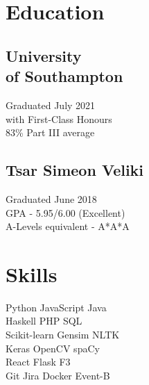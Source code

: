 \documentclass[]{resume}
\begin{document}
\hfill
%
%
\begin{minipage}[t]{0.30\textwidth} 


\section{Education} 

\subsection*{University \\ of Southampton}
Graduated July 2021\\
with First-Class Honours\\
83\% Part III average
\sectionsep
\sectionsep
\subsection*{Tsar Simeon Veliki}
Graduated June 2018\\
GPA - 5.95/6.00 (Excellent)\\
A-Levels equivalent - A*A*A
\sectionsep


\section{Skills}
Python \textbullet{} JavaScript \textbullet{} Java\\Haskell \textbullet{} PHP \textbullet{} SQL\\
Scikit-learn \textbullet{} Gensim \textbullet{} NLTK\\Keras \textbullet{} OpenCV \textbullet{} spaCy\\
React \textbullet{} Flask \textbullet{} F3\\
Git \textbullet{} Jira \textbullet{} Docker \textbullet{} Event-B

\sectionsep


\end{minipage}
\end{document}
